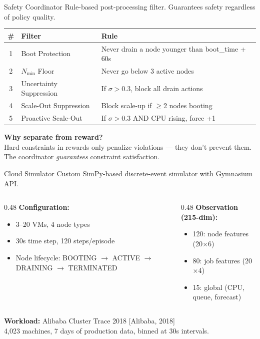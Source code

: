 \documentclass[aspectratio=169,11pt]{beamer}
\begin{document}
\begin{frame}{Safety Coordinator}
Rule-based post-processing filter. Guarantees safety regardless of policy quality.

\vspace{0.3cm}
\begin{center}
\begin{tabular}{clp{7cm}}
\toprule
\textbf{\#} & \textbf{Filter} & \textbf{Rule} \\
\midrule
1 & Boot Protection & Never drain a node younger than boot\_time + 60s \\
2 & $N_{\min}$ Floor & Never go below 3 active nodes \\
3 & Uncertainty Suppression & If $\sigma > 0.3$, block all drain actions \\
4 & Scale-Out Suppression & Block scale-up if $\geq$2 nodes booting \\
5 & Proactive Scale-Out & If $\sigma > 0.3$ AND CPU rising, force +1 \\
\bottomrule
\end{tabular}
\end{center}

\vspace{0.3cm}
\textbf{Why separate from reward?}\\
Hard constraints in rewards only penalize violations --- they don't prevent them.
The coordinator \textit{guarantees} constraint satisfaction.
\end{frame}

\begin{frame}{Cloud Simulator}
Custom SimPy-based discrete-event simulator with Gymnasium API.

\vspace{0.3cm}
\begin{columns}[T]
\begin{column}{0.48\textwidth}
\textbf{Configuration:}
\begin{itemize}
  \item 3--20 VMs, 4 node types
  \item 30s time step, 120 steps/episode
  \item Node lifecycle: BOOTING $\to$ ACTIVE $\to$ DRAINING $\to$ TERMINATED
\end{itemize}
\end{column}
\begin{column}{0.48\textwidth}
\textbf{Observation (215-dim):}
\begin{itemize}
  \item 120: node features (20$\times$6)
  \item 80: job features (20$\times$4)
  \item 15: global (CPU, queue, forecast)
\end{itemize}
\end{column}
\end{columns}

\vspace{0.3cm}
\textbf{Workload:} Alibaba Cluster Trace 2018 [Alibaba, 2018]\\
4,023 machines, 7 days of production data, binned at 30s intervals.
\end{frame}
\end{document}
